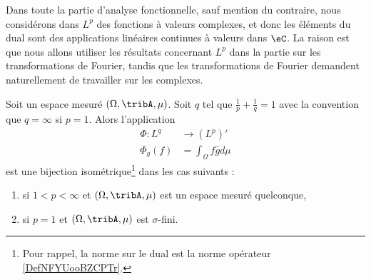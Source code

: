 Dans toute la partie d'analyse fonctionnelle, sauf mention du contraire, nous considérons dans \( L^p\) des fonctions à valeurs complexes, et donc les éléments du dual sont des applications linéaires continues à valeurs dans \( \eC\). La raison est que nous allons utiliser les résultats concernant \( L^p\) dans la partie sur les transformations de Fourier, tandis que les transformations de Fourier demandent naturellement de travailler sur les complexes.

\begin{theorem}
	\label{ThoLPQPooPWBXuv}
	Soit un espace mesuré \( (\Omega,\tribA,\mu)\). Soit \( q\) tel que \( \frac{1}{ p }+\frac{1}{ q }=1\) avec la convention que \( q=\infty\) si \( p=1\). Alors l'application
	\begin{equation}
		\begin{aligned}
			\Phi\colon L^q & \to (L^p)'                \\
			\Phi_g(f)      & =\int_{\Omega}f\bar gd\mu
		\end{aligned}
	\end{equation}
	est une bijection isométrique\footnote{Pour rappel, la norme sur le dual est la norme opérateur \ref{DefNFYUooBZCPTr}.} dans les cas suivants :
	\begin{enumerate}
		\item       \label{ITEMooSQQBooWSFBmX}
		      si \( 1<p<\infty\) et \( (\Omega,\tribA,\mu)\) est un espace mesuré quelconque,
		\item       \label{ITEMooCQGJooOWzjoV}
		      si \( p=1\) et \( (\Omega,\tribA, \mu)\) est \( \sigma\)-fini.
	\end{enumerate}
\end{theorem}

